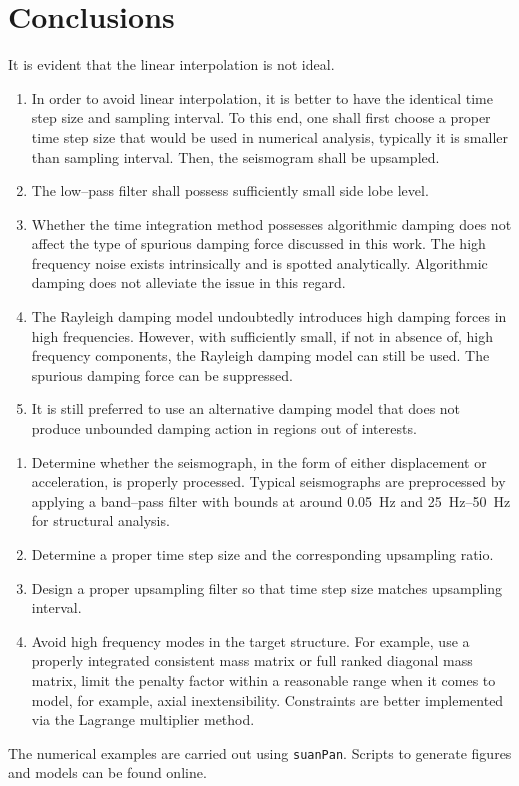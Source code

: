\section{Conclusions}
It is evident that the linear interpolation is not ideal.
\begin{enumerate}
\item In order to avoid linear interpolation, it is better to have the identical time step size and sampling interval. To this end, one shall first choose a proper time step size that would be used in numerical analysis, typically it is smaller than sampling interval. Then, the seismogram shall be upsampled.
\item The low--pass filter shall possess sufficiently small side lobe level.
\item Whether the time integration method possesses algorithmic damping does not affect the type of spurious damping force discussed in this work. The high frequency noise exists intrinsically and is spotted analytically. Algorithmic damping does not alleviate the issue in this regard.
\item The Rayleigh damping model undoubtedly introduces high damping forces in high frequencies. However, with sufficiently small, if not in absence of, high frequency components, the Rayleigh damping model can still be used. The spurious damping force can be suppressed.
\item It is still preferred to use an alternative damping model that does not produce unbounded damping action in regions out of interests.
\end{enumerate}

\begin{enumerate}
\item Determine whether the seismograph, in the form of either displacement or acceleration, is properly processed. Typical seismographs are preprocessed by applying a band--pass filter with bounds at around \SI{0.05}{\hertz} and \SIrange{25}{50}{\hertz} for structural analysis.
\item Determine a proper time step size and the corresponding upsampling ratio.
\item Design a proper upsampling filter so that time step size matches upsampling interval.
\item Avoid high frequency modes in the target structure. For example, use a properly integrated consistent mass matrix or full ranked diagonal mass matrix, limit the penalty factor within a reasonable range when it comes to model, for example, axial inextensibility. Constraints are better implemented via the Lagrange multiplier method.
\end{enumerate}

The numerical examples are carried out using \texttt{suanPan}. Scripts to generate figures and models can be found online.